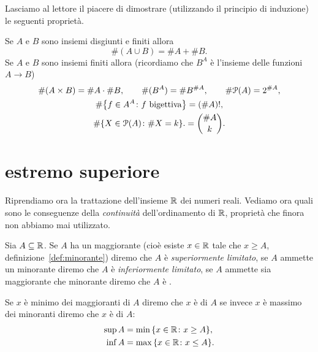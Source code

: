 Lasciamo al lettore il piacere di dimostrare (utilizzando il principio di induzione)
le seguenti proprietà.
\begin{theorem}
  \label{th:combinatoria}
  Se $A$ e $B$ sono insiemi disgiunti e finiti allora  
  \[
    \#(A\cup B) = \#A + \#B.
  \]
  Se $A$ e $B$ sono insiemi finiti allora 
  (ricordiamo che $B^A$ è l'insieme delle funzioni $A\to B$)
  \begin{gather*}
    \#(A \times B) = \#A\cdot \#B, \qquad
    \#(B^A) = \#B^{\#A}, \qquad
    \#\mathcal P(A) = 2^{\# A}, \\
    \#{\left\{ f\in A^A\colon \text{$f$ bigettiva} \right\}} = (\#A)!, \\
     \#{\left\{ X\in \mathcal P(A)\colon \#X = k \right\}}.  
     = {\#A \choose k}. 
  \end{gather*}
\end{theorem}
  
\section{estremo superiore}

Riprendiamo ora la trattazione dell'insieme $\mathbb R$ dei numeri reali.
Vediamo ora quali sono le conseguenze della \emph{continuità}
dell'ordinamento di $\mathbb R$, proprietà che finora non abbiamo mai 
utilizzato.

\begin{definition}
  \mymark{***}
  Sia $A \subseteq \mathbb R$.
  Se $A$ ha un maggiorante (cioè esiste $x\in \mathbb R$ tale che $x\ge A$, definizione~\ref{def:minorante})
  diremo che $A$ è \emph{superiormente limitato},
  se $A$ ammette un minorante diremo che $A$ è \emph{inferiormente limitato},
  se $A$ ammette sia maggiorante che minorante diremo che $A$ è 
  .
  
  Se $x$ è minimo dei maggioranti di $A$ diremo che $x$ è
  di $A$ se invece $x$ è massimo dei minoranti diremo che $x$ è
   di $A$:
  \begin{align*}
  \sup A &= \min {\left\{ x\in \mathbb R\colon x\ge A \right\}}, \\
  \inf A &= \max {\left\{ x\in \mathbb R\colon x \le A \right\}}.
  \end{align*}
  \index{$\sup$}%
  \index{$\inf$}%
\end{definition}

